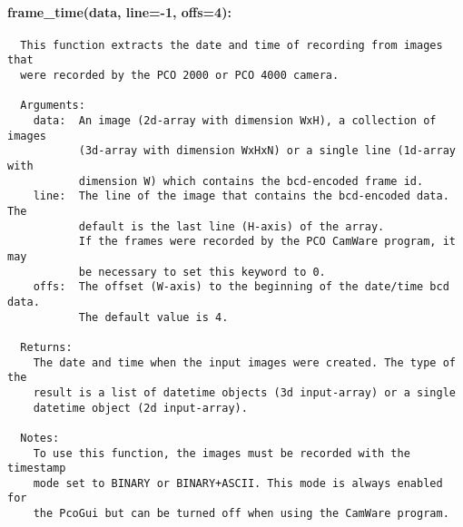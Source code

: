 \documentclass[11pt, a4paper]{scrartcl}
\begin{document}
\paragraph{frame\_time(data, line=-1, offs=4):}
\begin{verbatim}
  This function extracts the date and time of recording from images that
  were recorded by the PCO 2000 or PCO 4000 camera.

  Arguments:
    data:  An image (2d-array with dimension WxH), a collection of images
           (3d-array with dimension WxHxN) or a single line (1d-array with
           dimension W) which contains the bcd-encoded frame id.
    line:  The line of the image that contains the bcd-encoded data. The
           default is the last line (H-axis) of the array.
           If the frames were recorded by the PCO CamWare program, it may
           be necessary to set this keyword to 0.
    offs:  The offset (W-axis) to the beginning of the date/time bcd data.
           The default value is 4.

  Returns:
    The date and time when the input images were created. The type of the
    result is a list of datetime objects (3d input-array) or a single
    datetime object (2d input-array).

  Notes:
    To use this function, the images must be recorded with the timestamp
    mode set to BINARY or BINARY+ASCII. This mode is always enabled for
    the PcoGui but can be turned off when using the CamWare program.
\end{verbatim}
\end{document}
